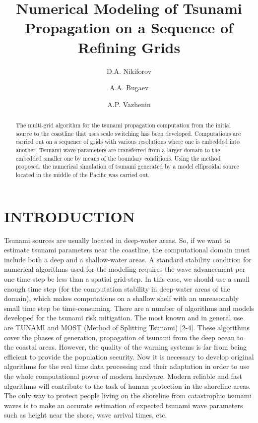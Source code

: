 \documentclass{aip-cp}
\begin{document}
\title{Numerical Modeling of Tsunami Propagation on a Sequence of Refining Grids}

\author[aff1]{D.A. Nikiforov}
\author[aff2]{A.A. Bugaev}
\author[aff1]{A.P. Vazhenin}


\maketitle

\begin{abstract}
The multi-grid algorithm for the tsunami propagation computation from the 
initial source to the coastline that uses scale switching has been 
developed. Computations are carried out on a sequence of grids with various 
resolutions where one is embedded into another. Tsunami wave parameters are 
transferred from a larger domain to the embedded smaller one by means of the 
boundary conditions. Using the method proposed, the numerical simulation of 
tsunami generated by a model ellipsoidal source located in the middle of the 
Pacific was carried out. 
\end{abstract}

\section{INTRODUCTION}
Tsunami sources are usually located in deep-water areas. So, if we want to 
estimate tsunami parameters near the coastline, the computational domain 
must include both a deep and a shallow-water areas. A standard stability 
condition for numerical algorithms used for the modeling requires the wave 
advancement per one time step be less than a spatial grid-step. In this 
case, we should use a small enough time step (for the computation stability 
in deep-water areas of the domain), which makes computations on a shallow 
shelf with an unreasonably small time step be time-consuming. There are a 
number of algorithms and models developed for the tsunami risk mitigation. 
The most known and in general use are TUNAMI \cite{bib1} and MOST (Method
of Splitting Tsunami) [2-4]. These algorithms cover the phases of
generation, propagation of tsunami from the deep ocean to the coastal areas. However, 
the quality of the warning systems is far from being efficient to provide 
the population security. Now it is necessary to develop original algorithms 
for the real time data processing and their adaptation in order to use the 
whole computational power of modern hardware. Modern reliable and fast 
algorithms will contribute to the task of human protection in the shoreline 
areas. The only way to protect people living on the shoreline from 
catastrophic tsunami waves is to make an accurate estimation of expected 
tsunami wave parameters such as height near the shore, wave arrival times, 
etc. 
\end{document}
